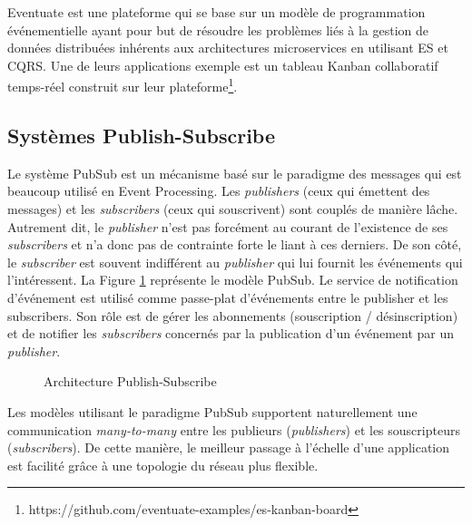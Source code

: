 Eventuate est une plateforme qui se base sur un modèle de programmation 
événementielle ayant pour but de résoudre les problèmes liés à la gestion de 
données distribuées inhérents aux architectures microservices en utilisant \gls{ES} et
\gls{CQRS}. Une de leurs applications exemple est un tableau Kanban collaboratif 
temps-réel construit sur leur 
plateforme\footnote{https://github.com/eventuate-examples/es-kanban-board}. 
	\subsection{Systèmes Publish-Subscribe}

Le système \gls{PubSub} est un mécanisme basé sur le 
paradigme des 
messages qui est beaucoup utilisé en Event Processing. 
Les \textit{publishers} (ceux qui émettent des messages) et les \textit{subscribers} 
(ceux qui souscrivent) sont couplés de manière lâche. 
Autrement dit, le \textit{publisher} n'est pas forcément au courant de l'existence de 
ses \textit{subscribers} et n'a donc pas de contrainte forte le liant à ces derniers. 
De son côté, le \textit{subscriber} est souvent indifférent au \textit{publisher} qui lui 
fournit les événements qui l'intéressent. La Figure \ref{fig:pubsub} représente le 
modèle \gls{PubSub}.
Le service de notification d'événement est utilisé comme passe-plat d'événements 
entre le publisher et les subscribers. Son rôle est de gérer les abonnements 
(souscription / désinscription) et de notifier les \textit{subscribers} concernés par la 
publication d'un événement par un \textit{publisher}.

\begin{figure}[ht!]
	\centering
	\caption{Architecture Publish-Subscribe}
	\label{fig:pubsub}
\end{figure}


Les modèles utilisant le paradigme \gls{PubSub} supportent naturellement une 
communication \textit{many-to-many} 
entre les publieurs (\textit{publishers}) et les souscripteurs (\textit{subscribers}).  De cette manière, le meilleur passage à l'échelle d'une application est facilité grâce à une topologie du réseau plus flexible. 


